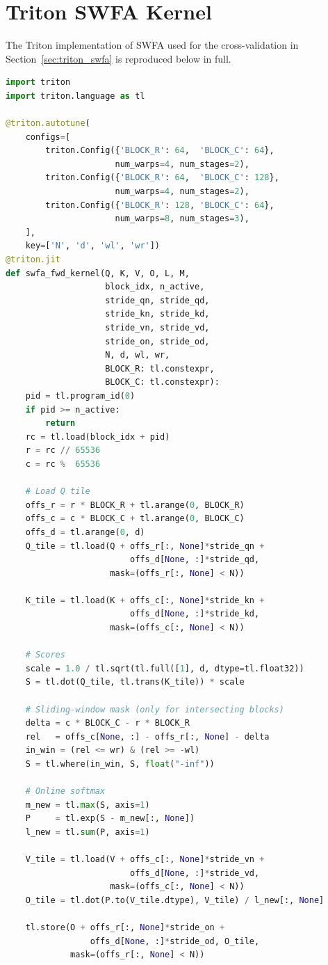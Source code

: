 \section{Triton SWFA Kernel}\label{app:triton_swfa}

The Triton implementation of SWFA used for the cross-validation in
Section~\ref{sec:triton_swfa} is reproduced below in full.

\begin{lstlisting}[language=Python,basicstyle=\ttfamily\scriptsize]
import triton
import triton.language as tl

@triton.autotune(
    configs=[
        triton.Config({'BLOCK_R': 64,  'BLOCK_C': 64},
                      num_warps=4, num_stages=2),
        triton.Config({'BLOCK_R': 64,  'BLOCK_C': 128},
                      num_warps=4, num_stages=2),
        triton.Config({'BLOCK_R': 128, 'BLOCK_C': 64},
                      num_warps=8, num_stages=3),
    ],
    key=['N', 'd', 'wl', 'wr'])
@triton.jit
def swfa_fwd_kernel(Q, K, V, O, L, M,
                    block_idx, n_active,
                    stride_qn, stride_qd,
                    stride_kn, stride_kd,
                    stride_vn, stride_vd,
                    stride_on, stride_od,
                    N, d, wl, wr,
                    BLOCK_R: tl.constexpr,
                    BLOCK_C: tl.constexpr):
    pid = tl.program_id(0)
    if pid >= n_active:
        return
    rc = tl.load(block_idx + pid)
    r = rc // 65536
    c = rc %  65536

    # Load Q tile
    offs_r = r * BLOCK_R + tl.arange(0, BLOCK_R)
    offs_c = c * BLOCK_C + tl.arange(0, BLOCK_C)
    offs_d = tl.arange(0, d)
    Q_tile = tl.load(Q + offs_r[:, None]*stride_qn +
                         offs_d[None, :]*stride_qd,
                     mask=(offs_r[:, None] < N))

    K_tile = tl.load(K + offs_c[:, None]*stride_kn +
                         offs_d[None, :]*stride_kd,
                     mask=(offs_c[:, None] < N))

    # Scores
    scale = 1.0 / tl.sqrt(tl.full([1], d, dtype=tl.float32))
    S = tl.dot(Q_tile, tl.trans(K_tile)) * scale

    # Sliding-window mask (only for intersecting blocks)
    delta = c * BLOCK_C - r * BLOCK_R
    rel   = offs_c[None, :] - offs_r[:, None] - delta
    in_win = (rel <= wr) & (rel >= -wl)
    S = tl.where(in_win, S, float("-inf"))

    # Online softmax
    m_new = tl.max(S, axis=1)
    P     = tl.exp(S - m_new[:, None])
    l_new = tl.sum(P, axis=1)

    V_tile = tl.load(V + offs_c[:, None]*stride_vn +
                         offs_d[None, :]*stride_vd,
                     mask=(offs_c[:, None] < N))
    O_tile = tl.dot(P.to(V_tile.dtype), V_tile) / l_new[:, None]

    tl.store(O + offs_r[:, None]*stride_on +
                 offs_d[None, :]*stride_od, O_tile,
             mask=(offs_r[:, None] < N))
\end{lstlisting}

